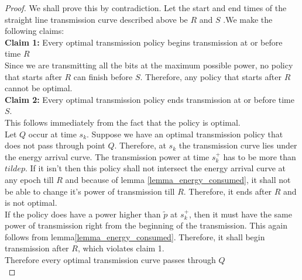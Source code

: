 \begin{proof}
We shall prove this by contradiction. Let the start and end times of the straight line transmission curve described above be $R$ and $S$ .We make the following claims:\\
\textbf{Claim 1:} Every optimal transmission policy begins transmission at or before time $R$\\
Since we are transmitting all the bits at the maximum possible power, no policy that starts after $R$ can finish before $S$. Therefore, any policy that starts after $R$ cannot be optimal.\\
\textbf{Claim 2:} Every optimal transmission policy ends transmission at or before time $S$.\\
This follows immediately from the fact that the policy is optimal. \\
Let $Q$ occur at time $s_k$. Suppose we have an optimal transmission policy that does not pass through point $Q$. Therefore, at $s_k$ the transmission curve lies under the energy arrival curve. The transmission power at time $s_k^+$ has to be more than $tilde{p}$. If it isn't then this policy shall not intersect the energy arrival curve at any epoch till $R$ and because of lemma \ref{lemma_energy_consumed}, it shall not be able to change it's power of transmission till $R$. Therefore, it ends after $R$ and is not optimal.\\
If the policy does have a power higher than $\tilde{p}$ at $s_k^+$, then it must have the same power of transmission right from the beginning of the transmission. This again follows from lemma\ref{lemma_energy_consumed}. Therefore, it shall begin transmission after $R$, which violates claim 1. \\
Therefore every optimal transmission curve passes through $Q$\\
\end{proof}

